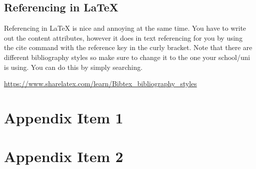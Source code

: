 \documentclass[11pt,a4paper,titlepage]{article}
\begin{document}
\subsection{Referencing in \LaTeX{}}

Referencing in \LaTeX{} is nice and annoying at the same time. You have to write out the content attributes, however it does in text referencing for you by using  the cite command with the reference key in the curly bracket. Note that there are different bibliography styles so make sure to change it to the one your school/uni is using. You can do this by simply searching.

\url{https://www.sharelatex.com/learn/Bibtex_bibliography_styles}






\clearpage
\appendix


\section{Appendix Item 1}
\label{appendix:Appendix1}

\section{Appendix Item 2}
\label{appendix:Appendix2}
\end{document}
